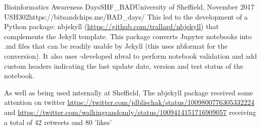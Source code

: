 \begin{event}{Bioinformatics Awareness Days}{SHF_BAD}{University of Sheffield, November 2017 }{USH}{30}{2}{https://bitsandchips.me/BAD_days/}
This led to the development of a Python package: nbjekyll (\url{https://github.com/trallard/nbjekyll}) that complements the Jekyll template. This package converts Jupyter notebooks into .md files that can be readily usable by Jekyll (this uses nbformat for the conversion). It also uses \ODK-developed nbval to perform notebook validation and add custom headers indicating the last update date, version and test status of the notebook.

As well as being used internally at Sheffield, The nbjekyll package received some attention on twitter \url{https://twitter.com/jdblischak/status/1009800776305332224} and \url{https://twitter.com/walkingrandomly/status/1009414151716909057} receiving a total of 42 retweets and 80 'likes'

\end{event}
